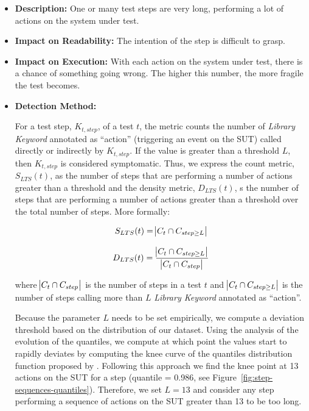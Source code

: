 \begin{itemize}
    \item \textbf{Description:} One or many test steps are very long, performing a lot of actions on the system under test.

    \item \textbf{Impact on Readability:} The intention of the step is difficult to grasp.
    
    \item \textbf{Impact on Execution:} With each action on the system under test, there is a chance of something going wrong. The higher this number, the more fragile the test becomes.
    
    \item \textbf{Detection Method:}
    
    For a test step, $K_{t, step}$, of a test $t$, the metric counts the number of \emph{Library Keyword} annotated as ``action'' (triggering an event on the SUT) called directly or indirectly by $K_{t, step}$. If the value is greater than a threshold $L$, then $K_{t, step}$ is considered symptomatic. Thus, we express the count metric, $S_{LTS}(t)$, as the number of steps that are performing a number of actions greater than a threshold and the density metric, $D_{LTS}(t)$, s the number of steps that are performing a number of actions greater than a threshold over the total number of steps. More formally:
    
    \begin{equation*}
        S_{LTS}(t) = \abs{C_t \cap C_{step \geq L}}
    \end{equation*}
    
    \begin{equation*}
        D_{LTS}(t) = \frac{\abs{C_t \cap C_{step \geq L}}}{\abs{C_t \cap C_{step}}}
    \end{equation*}
    
    where $\abs{C_t \cap C_{step}}$ is the number of steps in a test $t$ and $\abs{C_t \cap C_{step \geq L}}$ is the number of steps calling more than $L$ \emph{Library Keyword} annotated as ``action''. 
    
    Because the parameter $L$ needs to be set empirically, we compute a deviation threshold based on the distribution of our dataset. Using the analysis of the evolution of the quantiles, we compute at which point the values start to rapidly deviates by computing the knee curve of the quantiles distribution function proposed by \cite{Satopaa2011}. Following this approach we find the knee point at 13 actions on the SUT for a step (quantile = 0.986, see Figure~\ref{fig:step-sequences-quantiles}). Therefore, we set $L = 13$  and consider any step performing a sequence of actions on the SUT greater than 13 to be too long.


\end{itemize}
